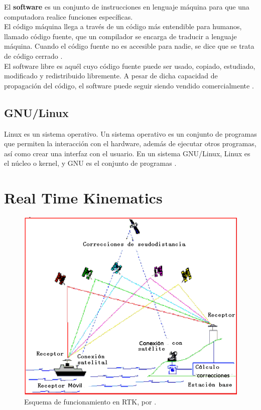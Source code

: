 
El \textbf{software} es un conjunto de instrucciones en lenguaje máquina para que una computadora realice funciones específicas.\\

El código máquina llega a través de un código más entendible para humanos, llamado código fuente, que un compilador se encarga de traducir a lenguaje máquina. Cuando el código fuente no es accesible para nadie, se dice que se trata de código cerrado \citep{i2005software}.\\

El software libre es aquél cuyo código fuente puede ser usado, copiado, estudiado, modificado y redistribuido libremente. A pesar de dicha capacidad de propagación del código, el software puede seguir siendo vendido comercialmente \citep{garcia2007promocion}. 

\subsection{GNU/Linux}
Linux es un sistema operativo. Un sistema operativo es un conjunto de programas que permiten la interacción con el hardware, además de ejecutar otros programas, así como crear una interfaz con el usuario. En un sistema GNU/Linux, Linux es el núcleo o kernel, y GNU es el conjunto de programas \citep{debian}. 


\section{Real Time Kinematics}

\begin{figure}[H]
\centering
\includegraphics[scale=0.53]{Figures/DGPS1}
\caption[Esquema de funcionamiento en RTK.]{Esquema de funcionamiento en RTK, por \cite{fallas2002sistema}.}
\label{fig:RTK}
\end{figure}

